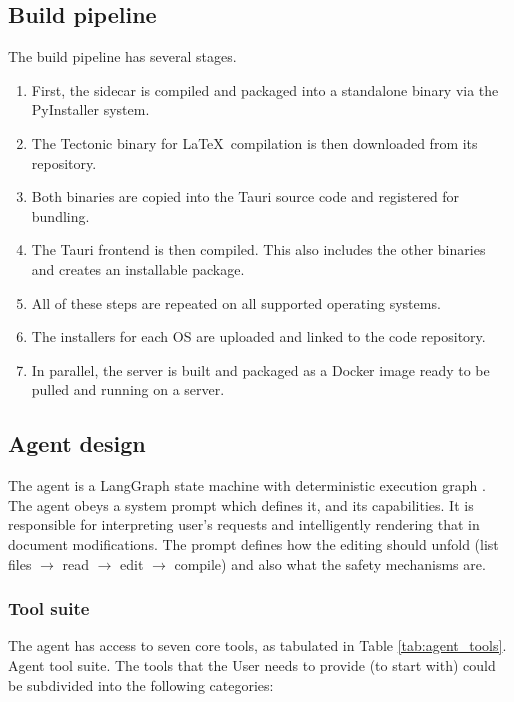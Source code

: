 \subsection{Build pipeline}

The build pipeline has several stages.

\begin{enumerate}
\item First, the sidecar is compiled and packaged into a standalone binary via the PyInstaller system.
\item The Tectonic binary for \LaTeX\ compilation is then downloaded from its repository.
\item Both binaries are copied into the Tauri source code and registered for bundling.
\item The Tauri frontend is then compiled.
This also includes the other binaries and creates an installable package.
\item All of these steps are repeated on all supported operating systems.
\item The installers for each OS are uploaded and linked to the code repository. 
\item In parallel, the server is built and packaged as a Docker image ready to be pulled and running on a server.
\end{enumerate}

\subsection{Agent design}

The agent is a LangGraph state machine with deterministic execution graph \cite{langgraph}.
The agent obeys a system prompt which defines it, and its capabilities.
It is responsible for interpreting user's requests and intelligently rendering that in document modifications.
The prompt defines how the editing should unfold (list files $\rightarrow$ read $\rightarrow$ edit $\rightarrow$ compile) and also what the safety mechanisms are.

\subsubsection{Tool suite} 

The agent has access to seven core tools, as tabulated in Table \ref{tab:agent_tools}.
Agent tool suite.
The tools that the User needs to provide (to start with) could be subdivided into the following categories:

